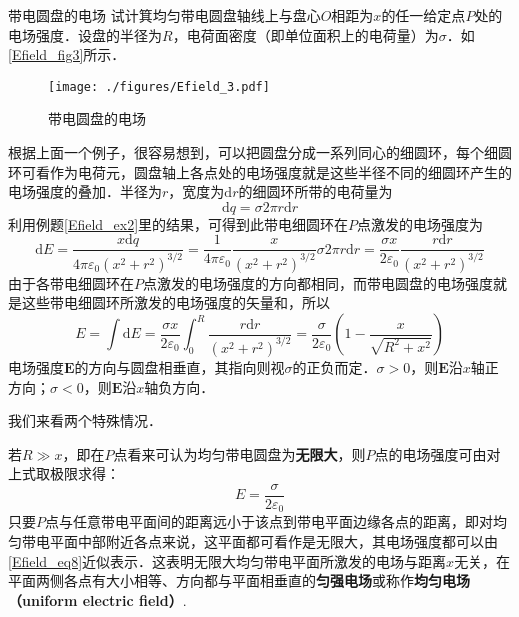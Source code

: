  
\begin{example}{带电圆盘的电场}\label{Efield_ex3}
试计箕均匀带电圆盘轴线上与盘心$O$相距为$x$的任一给定点$P$处的电场强度．设盘的半径为$R$，电荷面密度（即单位面积上的电荷量）为$\sigma$．如\autoref{Efield_fig3}所示．

\begin{figure}[ht]
\centering
\texttt{[image: ./figures/Efield\_3.pdf]}
\caption{带电圆盘的电场} \label{Efield_fig3}
\end{figure}

根据上面一个例子，很容易想到，可以把圆盘分成一系列同心的细圆环，每个细圆环可看作为电荷元，圆盘轴上各点处的电场强度就是这些半径不同的细圆环产生的电场强度的叠加．半径为$r$，宽度为$\mathrm dr$的细圆环所带的电荷量为
\begin{equation}
\mathrm{d} q=\sigma 2 \pi r \mathrm{d} r
\end{equation}
利用例题\autoref{Efield_ex2}里的结果，可得到此带电细圆环在$P$点激发的电场强度为
\begin{equation}
\mathrm{d} E=\frac{x \mathrm{d} q}{4 \pi \varepsilon_{0}\left(x^{2}+r^{2}\right)^{3 / 2}}=\frac{1}{4 \pi \varepsilon_{0}} \frac{x}{\left(x^{2}+r^{2}\right)^{3 / 2}} \sigma 2 \pi r \mathrm{d} r=\frac{\sigma x}{2 \varepsilon_{0}} \frac{r \mathrm{d} r}{\left(x^{2}+r^{2}\right)^{3 / 2}}
\end{equation}
由于各带电细圆环在$P$点激发的电场强度的方向都相同，而带电圆盘的电场强度就是这些带电细圆环所激发的电场强度的矢量和，所以
\begin{equation}\label{Efield_eq7}
E=\int \mathrm{d} E=\frac{\sigma x}{2 \varepsilon_{0}} \int_{0}^{R} \frac{r \mathrm{d} r}{\left(x^{2}+r^{2}\right)^{3 / 2}}=\frac{\sigma}{2 \varepsilon_{0}}\left(1-\frac{x}{\sqrt{R^{2}+x^{2}}}\right)
\end{equation}
电场强度$\mathbf E$的方向与圆盘相垂直，其指向则视$\sigma$的正负而定．$\sigma>0$，则$\mathbf E$沿$x$轴正方向；$\sigma<0$，则$\mathbf E$沿$x$轴负方向．

我们来看两个特殊情况．

若$R\gg x$，即在$P$点看来可认为均匀带电圆盘为\textbf{无限大}，则$P$点的电场强度可由对上式取极限求得：
\begin{equation} \label{Efield_eq8}
E=\frac{\sigma}{2 \varepsilon_{0}}
\end{equation}
只要$P$点与任意带电平面间的距离远小于该点到带电平面边缘各点的距离，即对均匀带电平面中部附近各点来说，这平面都可看作是无限大，其电场强度都可以由\autoref{Efield_eq8}近似表示．这表明无限大均匀带电平面所激发的电场与距离$x$无关，在平面两侧各点有大小相等、方向都与平面相垂直的\textbf{匀强电场}或称作\textbf{均匀电场（uniform electric field）}.


\end{example}
